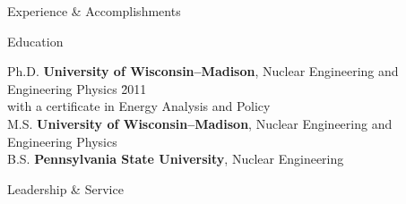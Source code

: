 \documentclass{resume3} %
\begin{document}
\begin{rSection}{Experience \& Accomplishments}

\end{rSection}

%


\begin{rSection}{Education}

\begin{tabbing}
Ph.D. \hspace*{1 em}\= \textbf{University of Wisconsin--Madison}, Nuclear Engineering and Engineering Physics \hspace*{1em} \= 2011 \\
      \> with a certificate in Energy Analysis and Policy \\
%
M.S. \hspace*{1 em}\> \textbf{University of Wisconsin--Madison}, Nuclear Engineering and Engineering Physics   \\
%
B.S. \hspace*{1 em}\> \textbf{Pennsylvania State University}, Nuclear Engineering  
\end{tabbing}
\end{rSection}
\vspace*{0.5em}
\begin{rSection}{Leadership \& Service}

\end{rSection}
\end{document}
